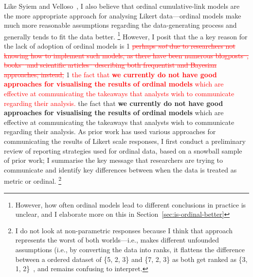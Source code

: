 \documentclass{vgtc}                          %
\def\trackchanges{0}
\newcommand{\new}[1]{%
\if\trackchanges1%
\textcolor{red}{#1}%
\else#1\fi}
\newcommand{\stout}[1]{\if\trackchanges1 \textcolor{red}{\sout{#1}} \fi}
\begin{document}
Like Syiem and Velloso~\cite{victorsyiem_better_2026}, I also believe that ordinal cumulative-link models are the more appropriate approach for analysing Likert data---ordinal models make much more reasonable assumptions regarding the data-generating process and generally tends to fit the data better.%
\footnote{However, how often ordinal models lead to different conclusions in practice is unclear, and I elaborate more on this in Section~\ref{sec:is-ordinal-better}}
However, I posit that the a key reason for the lack of adoption of ordinal models is 
{\stout{perhaps \textit{not} due to researchers not knowing how to implement such models, as there have been numerous blogposts~\cite[e.g.,][]{medina_ordinal_2021, kurz_ordinal_2026, kurz_causal_2023}, books~\cite[e.g.,][]{mcelreath_statistical_2020} and scientific articles~\cite[e.g.,][]{burkner_ordinal_2019, gambarota_ordinal_2024, agresti_tutorial_1989, victorsyiem_better_2026} describing both frequentist and Bayesian approaches; instead,}}
\new{
the fact that \textbf{we currently do not have good approaches for visualising the results of ordinal models} which are effective at communicating the takeaways that analysts wish to communicate regarding their analysis.} As prior work has used various approaches for communicating the results of Likert scale responses, I first conduct a preliminary review of reporting strategies used for ordinal data, based on a snowball sample of prior work; I summarise the key message that researchers are trying to communicate and identify key differences between when the data is treated as metric or ordinal.%
\footnote{I do not look at non-parametric responses because I think that approach represents the worst of both worlds---i.e., makes different unfounded assumptions (i.e., by converting the data into ranks, it flattens the difference between a ordered dataset of \{5, 2, 3\} and \{7, 2, 3\} as both get ranked as \{3, 1, 2\}~\cite{victorsyiem_better_2026}, and remains confusing to interpret.}
\end{document}

